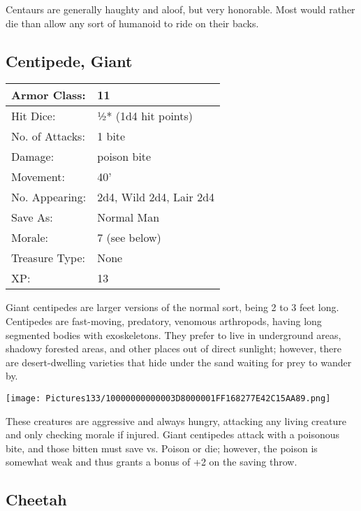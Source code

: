 \documentclass[a4paper,twoside,openany,10pt]{book}
\begin{document}
\begin{multicols}{2}
Centaurs are generally haughty and aloof, but very honorable. Most would rather die than allow any sort of humanoid to ride on their backs.


\subsection*{Centipede, Giant}\label{centipede-giant}

\begin{tabularx}{0.48\textwidth}{@{}lX@{}}
Armor Class: & 11 \\\hline
Hit Dice: & ½* (1d4 hit points) \\\hline
No. of Attacks: & 1 bite \\\hline
Damage: & poison bite \\\hline
Movement: & 40' \\\hline
No. Appearing: & 2d4, Wild 2d4, Lair 2d4 \\\hline
Save As: & Normal Man \\\hline
Morale: & 7 (see below) \\\hline
Treasure Type: & None \\\hline
XP: & 13 \\\hline
\end{tabularx}\medskip

Giant centipedes are larger versions of the normal sort, being 2 to 3 feet long. Centipedes are fast-moving, predatory, venomous arthropods, having long segmented bodies with exoskeletons. They prefer to live in underground areas, shadowy forested areas, and other places out of direct sunlight; however, there are desert-dwelling varieties that hide under the sand waiting for prey to wander by.


\begin{center}
	\texttt{[image: Pictures133/10000000000003D8000001FF168277E42C15AA89.png]}
\end{center}

These creatures are aggressive and always hungry, attacking any living creature and only checking morale if injured. Giant centipedes attack with a poisonous bite, and those bitten must save vs. Poison or die; however, the poison is somewhat weak and thus grants a bonus of +2 on the saving throw.


\subsection*{Cheetah}\label{cheetah}


\end{multicols}
\end{document}
